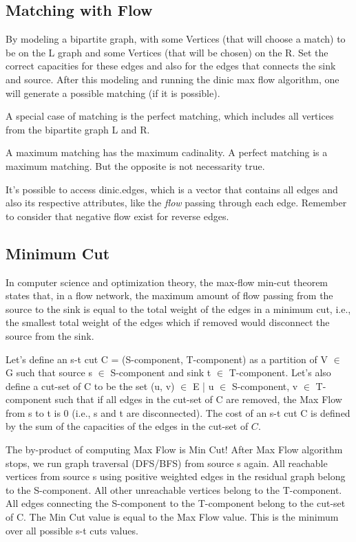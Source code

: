 \subsection{Matching with Flow}

	By modeling a bipartite graph, with some Vertices 
	(that will choose a match) 
	to be on the L graph and some Vertices (that will be chosen) on the R.
	Set the correct capacities for these edges 
	and also for the edges that connects the sink and source. 
	After this modeling
	and running the dinic max flow algorithm, 
	one will generate a possible matching (if it is possible).


	A special case of matching is the perfect matching, 
	which includes all vertices from the bipartite graph L and R.

	A maximum matching has the maximum cadinality. 
	A perfect matching is a maximum matching. 
	But the opposite is not necessarity true.

	It's possible to access dinic.edges, 
	which is a vector that contains all edges and also its 
	respective attributes, 
	like the \textit{flow} passing through each edge. 
	Remember to consider that negative flow exist for reverse edges.

\subsection{Minimum Cut}

In computer science and optimization theory, the max-flow min-cut theorem states that, in a flow network, 
the maximum amount of flow passing from the source to the sink is equal to the total weight of the edges 
in a minimum cut, i.e., the smallest total weight of the edges which if removed would disconnect the source from the sink. 

{Let's define an s-t cut C = (S-component, T-component) as a partition of V $\in$ G such that 
source s $\in$ S-component and sink t $\in$ T-component. Let's also define a cut-set of C to be the set 
(u, v) $\in$ E | u $\in$ S-component, v $\in$ T-component such that if all edges in the cut-set of C are removed,
the Max Flow from s to t is 0 (i.e., s and t are disconnected). The cost of an s-t cut C is defined by the sum
of the capacities of the edges in the cut-set of $C$.}

The by-product of computing Max Flow is Min Cut! After Max Flow algorithm stops, we run graph traversal (DFS/BFS)
from source s again. All reachable vertices from source s using positive weighted edges in the residual graph belong
to the S-component. All other unreachable vertices belong to the T-component. All edges connecting the S-component to
the T-component belong to the cut-set of C. The Min Cut value is equal to the Max Flow value.
This is the minimum over all possible s-t cuts values.

